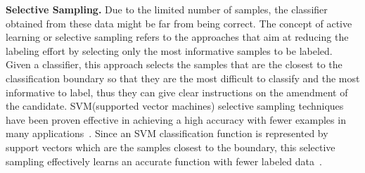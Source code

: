 \medskip\noindent
\textbf{Selective Sampling.}
Due to the limited number of samples, 
the classifier obtained from these data might be far from being correct. 
The concept of active learning or selective sampling refers to the approaches 
that aim at reducing the labeling effort by selecting only the most informative samples to be labeled.
Given a classifier, this approach selects the samples that are the closest to the classification boundary 
so that they are the most difficult to classify and the most informative to label,
thus they can give clear instructions on the amendment of the candidate.
SVM(supported vector machines) selective sampling techniques have been proven effective in achieving a high accuracy 
with fewer examples in many applications~\cite{DBLP:conf/mm/TongC01,DBLP:journals/jmlr/TongK01}. 
Since an SVM classification function is represented by support vectors which are the samples closest to the boundary, 
this selective sampling effectively learns an accurate function with fewer labeled data~\cite{DBLP:conf/icml/SchohnC00}.



 



